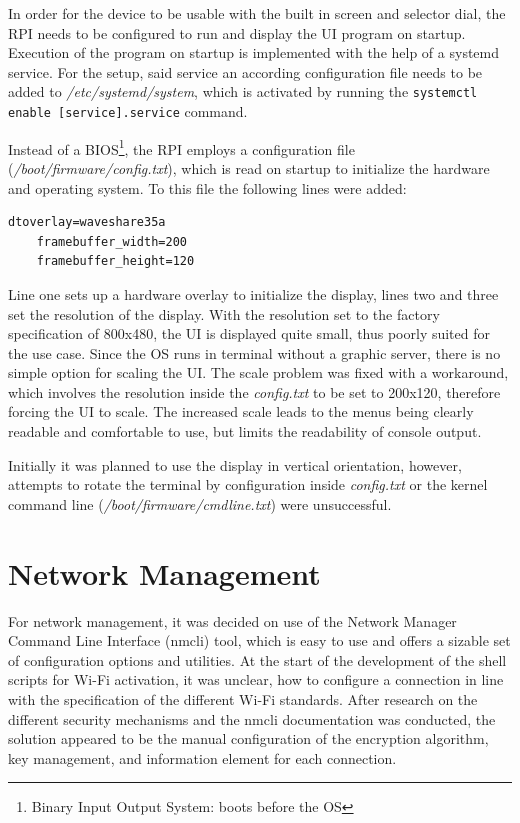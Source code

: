 In order for the device to be usable with the built in screen and selector dial, the RPI needs to be configured to run and display the UI program on startup.
Execution of the program on startup is implemented with the help of a systemd service.
For the setup, said service an according configuration file needs to be added to \textit{/etc/systemd/system}, which is activated by running the \lstinline[]|systemctl enable [service].service| command.

Instead of a BIOS\footnote{Binary Input Output System: boots before the OS}, the RPI employs a configuration file (\textit{/boot/firmware/config.txt}), which is read on startup to initialize the hardware and operating system.
To this file the following lines were added:

\begin{lstlisting}[numbers=none, frame=none]
    dtoverlay=waveshare35a
    framebuffer_width=200
    framebuffer_height=120 
\end{lstlisting}

Line one sets up a hardware overlay to initialize the display, lines two and three set the resolution of the display.
With the resolution set to the factory specification of 800x480, the UI is displayed quite small, thus poorly suited for the use case.
Since the OS runs in terminal without a graphic server, there is no simple option for scaling the UI.
The scale problem was fixed with a workaround, which involves the resolution inside the \textit{config.txt} to be set to 200x120, therefore forcing the UI to scale.
The increased scale leads to the menus being clearly readable and comfortable to use, but limits the readability of console output.

Initially it was planned to use the display in vertical orientation, however, attempts to rotate the terminal by configuration inside \textit{config.txt} or the kernel command line (\textit{/boot/firmware/cmdline.txt}) were unsuccessful.

\section{Network Management}\label{sec:network_management}
For network management, it was decided on use of the Network Manager Command Line Interface (nmcli) tool, which is easy to use and offers a sizable set of configuration options and utilities.
At the start of the development of the shell scripts for Wi-Fi activation, it was unclear, how to configure a connection in line with the specification of the different Wi-Fi standards.
After research on the different security mechanisms and the nmcli documentation was conducted, the solution appeared to be the manual configuration of the encryption algorithm, key management, and information element for each connection.

